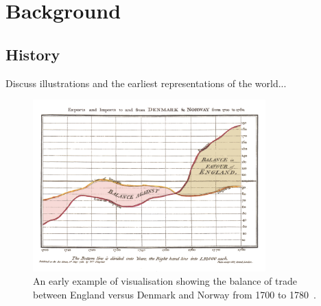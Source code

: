 






\section{Background}

\subsection{History}

Discuss illustrations and the earliest representations of the world...

\begin{figure}
    \centering
    \includegraphics[width=0.8\textwidth]{../images/playfair-graph.png}
    \caption{An early example of visualisation showing the balance of trade between England versus Denmark and Norway from 1700 to 1780~\protect\cite{Playfair1786}.}
    \label{fig:playfair-graph}
\end{figure}

